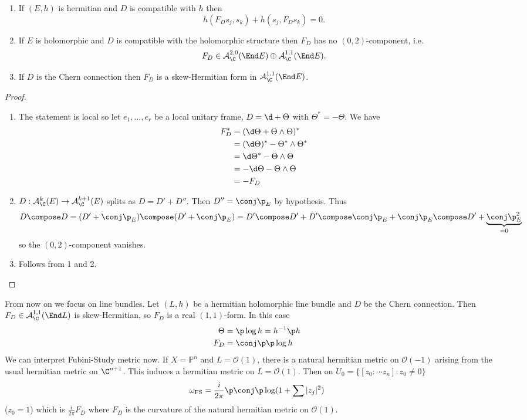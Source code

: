 \documentclass[a4paper]{article}
\renewcommand{\P}{\mathbb P} %
\newcommand{\w}{\wedge} %
\begin{document}
\begin{lemma}\leavevmode
  \begin{enumerate}
  \item If \((E, h)\) is hermitian and \(D\) is compatible with \(h\) then
    \[
      h(F_D s_j, s_k) + h(s_j, F_D s_k) = 0.
    \]
  \item If \(E\) is holomorphic and \(D\) is compatible with the holomorphic structure then \(F_D\) has no \((0, 2)\)-component, i.e.
    \[
      F_D \in \mathcal A_\C^{2, 0}(\End E) \oplus \mathcal A_\C^{1, 1}(\End E).
    \]
  \item If \(D\) is the Chern connection then \(F_D\) is a skew-Hermitian form in \(\mathcal A_\C^{1, 1}(\End E)\).
  \end{enumerate}
\end{lemma}

\begin{proof}\leavevmode
  \begin{enumerate}
  \item The statement is local so let \(e_1, \dots, e_r\) be a local unitary frame, \(D = \d + \Theta\) with \(\Theta^* = - \Theta\). We have
    \begin{align*}
      F_D^*
      &= (\d \Theta + \Theta \w \Theta)^* \\
      &= (\d \Theta)^* - \Theta^* \w \Theta^* \\
      &= \d \Theta^* - \Theta \w \Theta \\
      &= -\d \Theta - \Theta \w \Theta \\
      &= -F_D
    \end{align*}
  \item \(D: \mathcal A_\C^k(E) \to \mathcal A_\C^{k + 1}(E)\) splits as \(D = D' + D''\). Then \(D'' = \conj \p_E\) by hypothesis. Thus
    \[
      D \compose D
      = (D' + \conj \p_E) \compose (D' + \conj \p_E)
      = D' \compose D' + D' \compose \conj \p_E + \conj \p_E \compose D' + \underbrace{\conj \p_E^2}_{= 0}
    \]
    so the \((0, 2)\)-component vanishes.
  \item Follows from 1 and 2.
  \end{enumerate}
\end{proof}

From now on we focus on line bundles. Let \((L, h)\) be a hermitian holomorphic line bundle and \(D\) be the Chern connection. Then \(F_D \in \mathcal A_\C^{1, 1}(\End L)\) is skew-Hermitian, so \(F_D\) is a real \((1, 1)\)-form. In this case
\begin{align*}
  \Theta &= \p \log h = h^{-1} \p h \\
  F_D &= \conj \p \p \log h
\end{align*}
We can interpret Fubini-Study metric now. If \(X = \P^n\) and \(L = \mathcal O(1)\), there is a natural hermitian metric on \(\mathcal O(-1)\) arising from the usual hermitian metric on \(\C^{n + 1}\). This induces a hermitian metric on \(L = \mathcal O(1)\). Then on \(U_0 = \{[z_0: \cdots z_n]: z_0 \neq 0\}\)
\[
  \omega_{\text{FS}} = \frac{i}{2\pi} \p \conj \p \log (1 + \sum |z_j|^2)
\]
(\(z_0 = 1\)) which is \(\frac{i}{2\pi} F_D\) where \(F_D\) is the curvature of the natural hermitian metric on \(\mathcal O(1)\).
\end{document}
